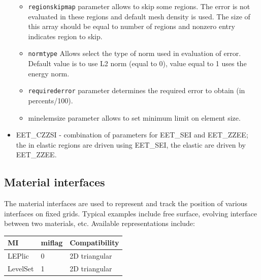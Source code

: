 \documentclass[a4paper]{article}
\newcommand{\param}[1]{\texttt{#1}} %
\begin{document}
\begin{itemize}
\begin{itemize}
\item \param{regionskipmap} parameter allows to skip some regions. The
error is not evaluated in these regions and default mesh density is
used. The size of this array should be equal to number of regions and
nonzero entry indicates region to skip.
\item \param{normtype} Allows select the type of norm used in
evaluation of error. Default value is to use L2 norm (equal to 0),
value equal to 1 uses the energy norm.
\item \param{requirederror} parameter determines the required error to
obtain (in percents/100).
\item{minelemsize} parameter allows to set minimum limit on element size.
\end{itemize}
\item
EET\_CZZSI - combination of parameters for EET\_SEI and EET\_ZZEE; the
in elastic regions are driven using EET\_SEI, the elastic are driven
by EET\_ZZEE.
\end{itemize}


\subsection{Material interfaces}
\label{materialinterfaces}
The material interfaces are used to represent and track the position of
various interfaces on fixed grids. Typical examples include free surface,
evolving interface between two materials, etc.
Available representations include:

\begin{tabular}{|l|l|l|}
\hline
MI & miflag & Compatibility  \\
\hline
LEPlic & 0 & 2D triangular \\
LevelSet & 1 & 2D triangular \\
\hline
\end{tabular}
\end{document}
